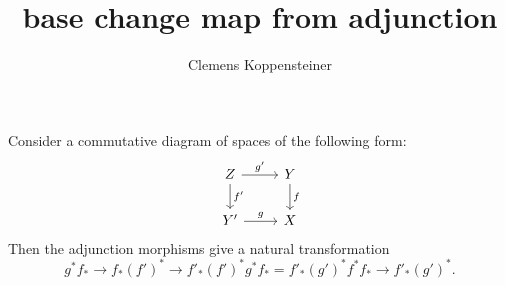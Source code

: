 \documentclass[english,no-theorem-numbers]{short-notes}
\title{base change map from adjunction}
\author{Clemens Koppensteiner}
\begin{document}
\maketitle

Consider a commutative diagram of spaces of the following form:
\[
    \begin{tikzcd}
        Z \arrow{r}{g'} \arrow{d}{f'} & Y \arrow{d}{f} \\
        Y' \arrow{r}{g} & X
    \end{tikzcd}
\]
Then the adjunction morphisms give a natural transformation
\[
    g^*f_* → f_*(f')^* →
    f'_*(f')^*g^*f_* =
    f'_*(g')^*f^*f_* →
    f'_*(g')^*.
\]
\end{document}
